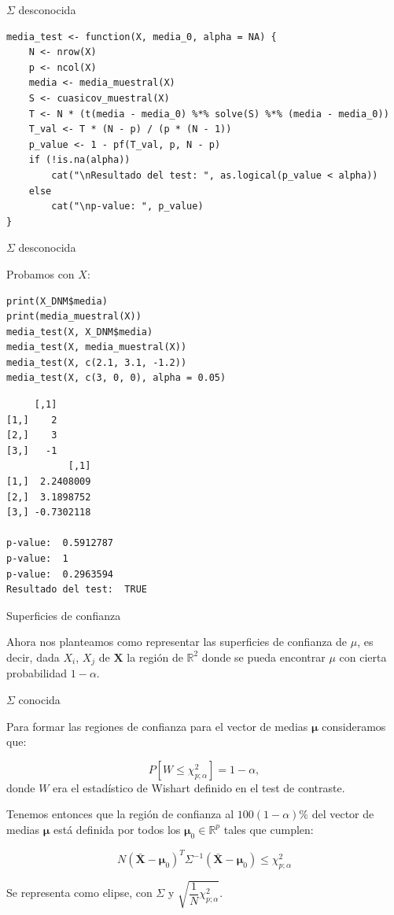 \documentclass[xcolor=table]{beamer}
\begin{document}
\begin{frame}[fragile]{$\Sigma$ desconocida}

\begin{lstlisting}
media_test <- function(X, media_0, alpha = NA) {
    N <- nrow(X)
    p <- ncol(X)
    media <- media_muestral(X)
    S <- cuasicov_muestral(X)
    T <- N * (t(media - media_0) %*% solve(S) %*% (media - media_0))
    T_val <- T * (N - p) / (p * (N - 1))
    p_value <- 1 - pf(T_val, p, N - p)
    if (!is.na(alpha))
        cat("\nResultado del test: ", as.logical(p_value < alpha))
    else
        cat("\np-value: ", p_value)
}

\end{lstlisting}

\end{frame}

\begin{frame}[fragile]{$\Sigma$ desconocida}

Probamos con $X$:

\scriptsize
\begin{lstlisting}
print(X_DNM$media)
print(media_muestral(X))
media_test(X, X_DNM$media)
media_test(X, media_muestral(X))
media_test(X, c(2.1, 3.1, -1.2))
media_test(X, c(3, 0, 0), alpha = 0.05)
\end{lstlisting}

\scriptsize
\begin{lstlisting}
     [,1]
[1,]    2
[2,]    3
[3,]   -1
           [,1]
[1,]  2.2408009
[2,]  3.1898752
[3,] -0.7302118

p-value:  0.5912787
p-value:  1
p-value:  0.2963594
Resultado del test:  TRUE
\end{lstlisting}

\end{frame}


\begin{frame}[fragile]{Superficies de confianza}

Ahora nos planteamos como representar las superficies de confianza de $\mu$, es decir, dada $X_i$, $X_j$ de $\pmb{X}$ la región de $\mathbb{R}^2$ donde se pueda encontrar $\mu$ con cierta probabilidad $1 - \alpha$.

\end{frame}

\begin{frame}[fragile]{$\Sigma$ conocida}

Para formar las regiones de confianza para el vector de medias $\pmb{\mu}$ consideramos que:

$$P[W \leq  \chi^2_{p;\alpha}]= 1 - \alpha,$$
donde $W$ era el estadístico de Wishart definido en el test de contraste.

Tenemos entonces que la región de confianza al $100(1 - \alpha)\%$ del vector de medias $\pmb{\mu}$ está definida por todos los $\pmb{\mu}_0 \in \mathbb{R}^p$ tales que cumplen:

$$N (\pmb{\bar{X}} - \pmb{\mu}_0)^T \Sigma^{-1}(\pmb{\bar{X}} - \pmb{\mu}_0) \leq \chi^2_{p;\alpha}$$

Se representa como elipse, con $\Sigma$ y $\sqrt{\dfrac{1}{N} \chi^2_{p;\alpha}}$.

\end{frame}
\end{document}
